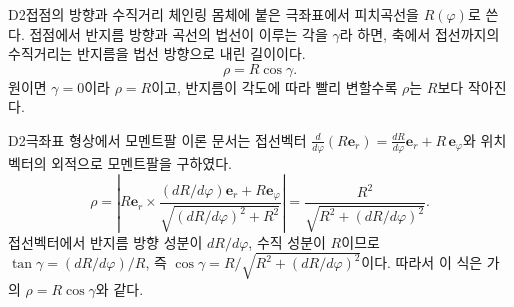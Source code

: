 \begin{dupA}{D2}{접점의 방향과 수직거리}
체인링 몸체에 붙은 극좌표에서 피치곡선을 \(R(\varphi)\)로 쓴다. 접점에서 반지름 방향과 곡선의 법선이 이루는 각을 \(\gamma\)라 하면, 축에서 접선까지의 수직거리는 반지름을 법선 방향으로 내린 길이이다.
\[
\rho=R\cos\gamma .
\]
원이면 \(\gamma=0\)이라 \(\rho=R\)이고, 반지름이 각도에 따라 빨리 변할수록 \(\rho\)는 \(R\)보다 작아진다.
\end{dupA}
\begin{dupB}{D2}{극좌표 형상에서 모멘트팔}
이론 문서는 접선벡터 \(\frac{d}{d\varphi}(R\mathbf e_r)=\frac{dR}{d\varphi}\mathbf e_r+R\,\mathbf e_\varphi\)와 위치벡터의 외적으로 모멘트팔을 구하였다.
\[
\rho=\left|R\mathbf e_r\times\frac{(dR/d\varphi)\mathbf e_r+R\mathbf e_\varphi}{\sqrt{(dR/d\varphi)^2+R^2}}\right|=\frac{R^2}{\sqrt{R^2+(dR/d\varphi)^2}} .
\]
접선벡터에서 반지름 방향 성분이 \(dR/d\varphi\), 수직 성분이 \(R\)이므로 \(\tan\gamma=(dR/d\varphi)/R\), 즉 \(\cos\gamma=R/\sqrt{R^2+(dR/d\varphi)^2}\)이다. 따라서 이 식은 가의 \(\rho=R\cos\gamma\)와 같다.
\end{dupB}

